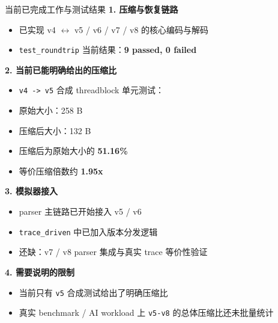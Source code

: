 \documentclass[aspectratio=169]{beamer}
\begin{document}
\begin{frame}{当前已完成工作与测试结果}
\textbf{1. 压缩与恢复链路}
\begin{itemize}
  \item 已实现 v4 $\leftrightarrow$ v5 / v6 / v7 / v8 的核心编码与解码
  \item \texttt{test\_roundtrip} 当前结果：\textbf{9 passed, 0 failed}
\end{itemize}

\vspace{0.5em}
\textbf{2. 当前已能明确给出的压缩比}
\begin{itemize}
  \item \texttt{v4 -> v5} 合成 threadblock 单元测试：
  \item 原始大小：258 B
  \item 压缩后大小：132 B
  \item 压缩后为原始大小的 \textbf{51.16\%}
  \item 等价压缩倍数约 \textbf{1.95x}
\end{itemize}

\vspace{0.5em}
\textbf{3. 模拟器接入}
\begin{itemize}
  \item parser 主链路已开始接入 v5 / v6
  \item \texttt{trace\_driven} 中已加入版本分发逻辑
  \item 还缺：v7 / v8 parser 集成与真实 trace 等价性验证
\end{itemize}

\vspace{0.5em}
\textbf{4. 需要说明的限制}
\begin{itemize}
  \item 当前只有 \texttt{v5} 合成测试给出了明确压缩比
  \item 真实 benchmark / AI workload 上 \texttt{v5-v8} 的总体压缩比还未批量统计
\end{itemize}
\end{frame}
\end{document}
